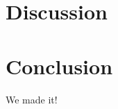 \chapter{Discussion}\label{ch:discussion}


\chapter{Conclusion}\label{ch:conclusion}

We made it!


